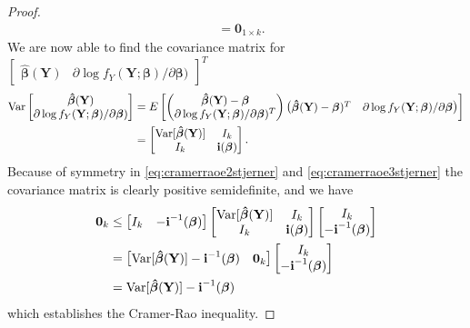\begin{proof}
\begin{align}
    &= \textbf{0}_{1 \times k} \label{eq:cramerraoe3stjerner}.
\end{align}
We are now able to find the covariance matrix for $\begin{bmatrix} \boldsymbol{\hat{\beta}}(\textbf{Y}) & \partial \log f_Y(\textbf{Y};\boldsymbol{\beta})/\partial \boldsymbol{\beta}) \end{bmatrix}^T$
\begin{align*}
    \operatorname{\text{Var}} \begin{bmatrix}  \boldsymbol{\hat{\beta}}(\textbf{Y}) \\  \partial \log f_Y(\textbf{Y};\boldsymbol{\beta})/\partial \boldsymbol{\beta}) \end{bmatrix} &= E \begin{bmatrix} \begin{pmatrix} \boldsymbol{\hat{\beta}}(\textbf{Y})-\boldsymbol{\beta} \\  \partial \log f_Y(\textbf{Y};\boldsymbol{\beta})/\partial \boldsymbol{\beta})^T\end{pmatrix} \begin{pmatrix} \boldsymbol{\hat{\beta}}(\textbf{Y})-\boldsymbol{\beta})^T &  \partial \log f_Y(\textbf{Y};\boldsymbol{\beta})/\partial \boldsymbol{\beta} \end{pmatrix}\end{bmatrix}  \\
    &= \begin{bmatrix} \operatorname{\text{Var}}[\boldsymbol{\hat{\beta}}(\textbf{Y})] & I_{k}\\
    I_{k} & \textbf{i}(\boldsymbol{\beta})\end{bmatrix}.
\end{align*}
Because of symmetry in \eqref{eq:cramerraoe2stjerner} and \eqref{eq:cramerraoe3stjerner} the covariance matrix is clearly positive semidefinite, and we have
\begin{align*}
    \textbf{0}_{k} & \leq \begin{bmatrix} I_{k} & -\textbf{i}^{-1}(\boldsymbol{\beta})\end{bmatrix} \begin{bmatrix} \operatorname{\text{Var}}[\boldsymbol{\hat{\beta}}(\textbf{Y})] & I_{k} \\ I_{k} & \textbf{i}(\boldsymbol{\beta}) \end{bmatrix}\begin{bmatrix} I_{k} \\ -\textbf{i}^{-1}(\boldsymbol{\beta})\end{bmatrix} \\
    &= \begin{bmatrix} \operatorname{\text{Var}}[\boldsymbol{\hat{\beta}}(\textbf{Y})] -\textbf{i}^{-1}(\boldsymbol{\beta}) & \textbf{0}_{k}\end{bmatrix} \begin{bmatrix} I_{k} \\ -\textbf{i}^{-1}(\boldsymbol{\beta})\end{bmatrix} \\
    &= \operatorname{\text{Var}}[\boldsymbol{\hat{\beta}}(\textbf{Y})] -\textbf{i}^{-1}(\boldsymbol{\beta})
\end{align*}
which establishes the Cramer-Rao inequality.
\end{proof}

